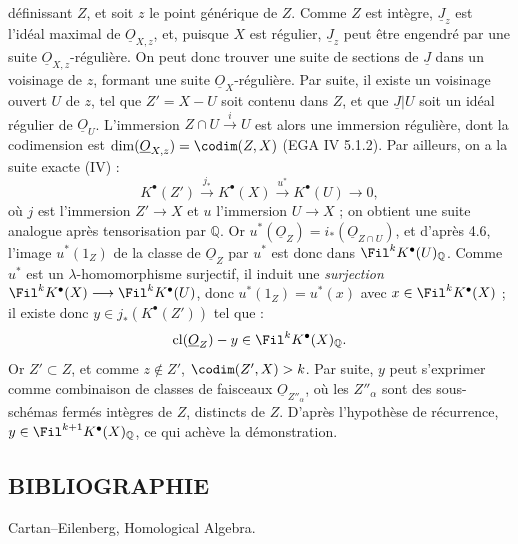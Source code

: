 
définissant \(Z\), et soit \(z\) le point générique de \(Z\). Comme \(Z\) est intègre, \(\underline{J}_z\) est l'idéal maximal de \(\underline{O}_{X,z}\), et, puisque \(X\) est régulier, \(\underline{J}_z\) peut être engendré par une suite \(\underline{O}_{X,z}\)-régulière. On peut donc trouver une suite de sections de \(\underline{J}\) dans un voisinage de \(z\), formant une suite \(\underline{O}_X\)-régulière. Par suite, il existe un voisinage ouvert \(U\) de \(z\), tel que \(Z'=X-U\) soit contenu dans \(Z\), et que \(\underline{J}|U\) soit un idéal régulier de \(\underline{O}_U\). L'immersion \(Z\cap U\xrightarrow{i}U\) est alors une immersion régulière, dont la codimension est \(\dim(\underline{O}_{X,z})=\codim(Z,X)\) (EGA IV 5.1.2). Par ailleurs, on a la suite exacte (IV\qquad) :
\[
  K^{\bullet}(Z')\xrightarrow{j_*}K^{\bullet}(X)
  \xrightarrow{u^*}K^{\bullet}(U)\to0,
\]
où \(j\) est l'immersion \(Z'\to X\) et \(u\) l'immersion \(U\to X\) ; on obtient une suite analogue après tensorisation par \(\mathbb Q\). Or \(u^*(\underline{O}_Z)=i_*(\underline{O}_{Z\cap U})\), et d'après 4.6, l'image \(u^*(1_Z)\) de la classe de \(\underline{O}_Z\) par \(u^*\) est donc dans \(\Fil^kK^{\bullet}(U)_{\mathbb Q}\). Comme \(u^*\) est un \(\lambda\)-homomorphisme surjectif, il induit une \emph{surjection} \(\Fil^kK^{\bullet}(X)\longrightarrow \Fil^kK^{\bullet}(U)\), donc \(u^*(1_Z)=u^*(x)\) avec \(x\in\Fil^kK^{\bullet}(X)\) ; il existe donc \(y\in j_*(K^{\bullet}(Z'))\) tel que :
\[
  \operatorname{cl}(\underline{O}_Z)-y\in\Fil^kK^{\bullet}(X)_{\mathbb Q}.
\]
Or \(Z'\subset Z\), et comme \(z\notin Z'\), \(\codim(Z',X)>k\). Par suite, \(y\) peut s'exprimer comme combinaison de classes de faisceaux \(\underline{O}_{Z''_\alpha}\), où les \(Z''_\alpha\) sont des sous-schémas fermés intègres de \(Z\), distincts de \(Z\). D'après l'hypothèse de récurrence, \(y\in\Fil^{k+1}K^{\bullet}(X)_{\mathbb Q}\), ce qui achève la démonstration.

\subsection*{BIBLIOGRAPHIE}
\begin{enumerate}[label={[\arabic*]}]
\item Cartan--Eilenberg, Homological Algebra.
\end{enumerate}



\providecommand{\etale}{\'etale}
\providecommand{\Ch}{\operatorname{Ch}}


